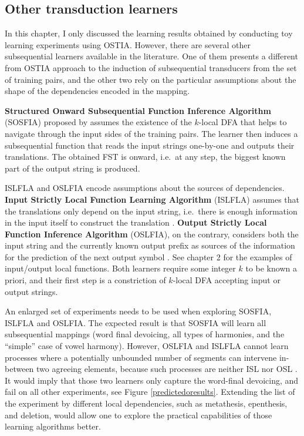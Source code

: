\subsection{Other transduction learners}

In this chapter, I only discussed the learning results obtained by conducting toy learning experiments using OSTIA.
However, there are several other subsequential learners available in the literature.
One of them presents a different from OSTIA approach to the induction of subsequential transducers from the set of training pairs, and the other two rely on the particular assumptions about the shape of the dependencies encoded in the mapping.

\textbf{Structured Onward Subsequential Function Inference Algorithm} (SOSFIA) proposed by \cite{JardineEtAl2014} assumes the existence of the $k$-local DFA that helps to navigate through the input sides of the training pairs.
The learner then induces a subsequential function that reads the input strings one-by-one and outputs their translations.
The obtained FST is onward, i.e.\ at any step, the biggest known part of the output string is produced.


ISLFLA and OSLFIA encode assumptions about the sources of dependencies.
\textbf{Input Strictly Local Function Learning Algorithm} (ISLFLA) assumes that the translations only depend on the input string, i.e.\ there is enough information in the input itself to construct the translation \citep{ChandleeEtAl2014}.
\textbf{Output Strictly Local Function Inference Algorithm} (OSLFIA), on the contrary, considers both the input string and the currently known output prefix as sources of the information for the prediction of the next output symbol \citep{ChandleeEtAl2015}.
See chapter 2 for the examples of input/output local functions.
Both learners require some integer $k$ to be known a priori, and their first step is a constriction of $k$-local DFA accepting input or output strings.

An enlarged set of experiments needs to be used when exploring SOSFIA, ISLFLA and OSLFIA.
The expected result is that SOSFIA will learn all subsequential mappings (word final devoicing, all types of harmonies, and the ``simple'' case of vowel harmony).
However, OSLFIA and ISLFLA cannot learn processes where a potentially unbounded number of segments can intervene in-between two agreeing elements, because such processes are neither ISL nor OSL \citep{ChandleeEtAl2015}.
It would imply that those two learners only capture the word-final devoicing, and fail on all other experiments, see Figure \ref{predictedoresults}.
Extending the list of the experiment by different local dependencies, such as metathesis, epenthesis, and deletion, would allow one to explore the practical capabilities of those learning algorithms better.



